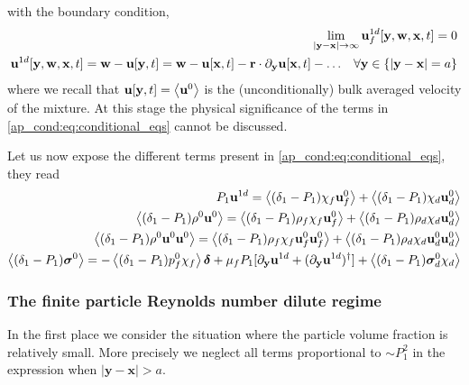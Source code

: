 with the boundary condition, 
\begin{align*}
    \lim_{|\textbf{y}-\textbf{x}|\to\infty} \textbf{u}^{1d}_f[\textbf{y},\textbf{w},\textbf{x},t] = 0 \\
    \textbf{u}^{1d}[\textbf{y},\textbf{w},\textbf{x},t] 
    = \textbf{w} - \textbf{u}[\textbf{y},t]
    = 
    \textbf{w} 
    - \textbf{u}[\textbf{x},t]
    -\textbf{r} \cdot {\partial_\textbf{y}}\textbf{u}[\textbf{x},t]
    - \ldots
    \;\;\; \forall \textbf{y} \in \{ |\textbf{y}-\textbf{x}| = a \}
     \\
\end{align*}
where we recall that $\textbf{u}[\textbf{y},t] = \left<\textbf{u}^0\right>$ is the (unconditionally) bulk averaged velocity of the mixture. 
At this stage the physical significance of the terms in \ref{ap_cond:eq:conditional_eqs} cannot be discussed.

Let us now expose the different terms present in \ref{ap_cond:eq:conditional_eqs}, they read 
\begin{align*}
    P_1 \textbf{u}^{1d}
    = \left<(\delta_1 - P_1) \chi_f \textbf{u}_f^0\right>
    + \left<(\delta_1 - P_1) \chi_d \textbf{u}_d^0\right>\\
    \left<(\delta_1 - P_1)\rho^0\textbf{u}^0\right>
    =
    \left<(\delta_1 - P_1)\rho_f\chi_f\textbf{u}^0_f\right>
    + \left<(\delta_1 - P_1)\rho_d\chi_d\textbf{u}^0_d\right>\\
    \left<(\delta_1 - P_1)\rho^0\textbf{u}^0\textbf{u}^0\right>
    =
    \left<(\delta_1 - P_1)\rho_f\chi_f\textbf{u}^0_f\textbf{u}_f^0\right>
    +\left<(\delta_1 - P_1)\rho_d\chi_d\textbf{u}^0_d\textbf{u}_d^0\right>\\
    \left<(\delta_1 - P_1)\bm\sigma^0\right>
    = 
    - \left<(\delta_1 - P_1)p_f^0 \chi_f\right> \bm\delta
    +\mu_fP_1[{\partial_\textbf{y}} \textbf{u}^{1d}+ ({\partial_\textbf{y}}\textbf{u}^{1d})^\dagger]
    + \left<(\delta_1 - P_1)\bm\sigma_d^0 \chi_d\right>
\end{align*}

\subsubsection{The finite particle Reynolds number dilute regime}
In the first place we consider the situation where the particle volume fraction is relatively small. 
More precisely we neglect all terms proportional to $\sim P_1^2$ in the expression when $|\textbf{y} - \textbf{x}| > a$. 


